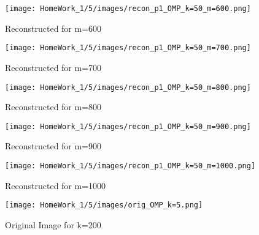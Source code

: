 \documentclass{article}
\begin{document}
\begin{figure}[h!]
    \begin{minipage}{0.1\textwidth}
        \centering
        \texttt{[image: HomeWork\_1/5/images/recon\_p1\_OMP\_k=50\_m=600.png]}
        \caption{Reconstructed for m=600}
    \end{minipage}
    \hspace{0.5cm}
    \begin{minipage}{0.1\textwidth}
        \centering
        \texttt{[image: HomeWork\_1/5/images/recon\_p1\_OMP\_k=50\_m=700.png]}
        \caption{Reconstructed for m=700}
    \end{minipage}
    \hspace{0.5cm}
    \begin{minipage}{0.1\textwidth}
        \centering
        \texttt{[image: HomeWork\_1/5/images/recon\_p1\_OMP\_k=50\_m=800.png]}
        \caption{\small Reconstructed for m=800}
    \end{minipage}
    \hspace{0.5cm}
    \begin{minipage}{0.1\textwidth}
        \centering
        \texttt{[image: HomeWork\_1/5/images/recon\_p1\_OMP\_k=50\_m=900.png]}
        \caption{Reconstructed for m=900}
    \end{minipage}
    \hspace{0.5cm}
    \begin{minipage}{0.1\textwidth}
        \centering
        \texttt{[image: HomeWork\_1/5/images/recon\_p1\_OMP\_k=50\_m=1000.png]}
        \caption{Reconstructed for m=1000}
    \end{minipage}
\end{figure}

\begin{figure}[h!]
        \centering
        \texttt{[image: HomeWork\_1/5/images/orig\_OMP\_k=5.png]}
        \caption{Original Image for k=200}
\end{figure}
\end{document}
